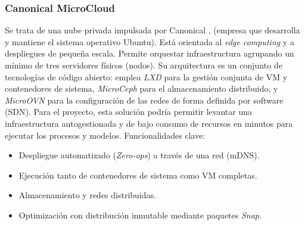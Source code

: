 \subsubsection*{Canonical MicroCloud}
Se trata de una nube privada impulsada por Canonical \citep{canonical2026microcloud}, (empresa que desarrolla y mantiene el sistema operativo Ubuntu). Está orientada al \textit{edge computing} y a despliegues de pequeña escala. Permite orquestar infraestructura agrupando un mínimo de tres servidores físicos (nodos). Su arquitectura es un conjunto de tecnologías de código abierto: emplea \textit{LXD} para la gestión conjunta de VM y contenedores de sistema, \textit{MicroCeph} para el almacenamiento distribuido, y \textit{MicroOVN} para la configuración de las redes de forma definida por software (SDN). Para el proyecto, esta solución podría permitir levantar una infraestructura autogestionada y de bajo consumo de recursos en minutos para ejecutar los procesos y modelos.
Funcionalidades clave:
\begin{itemize}
	\item Despliegue automatizado (\textit{Zero-ops}) a través de una red (mDNS).
	\item Ejecución tanto de contenedores de sistema como VM completas.
	\item Almacenamiento y redes distribuidas.
	\item Optimización con distribución inmutable mediante paquetes \textit{Snap}.
\end{itemize}

